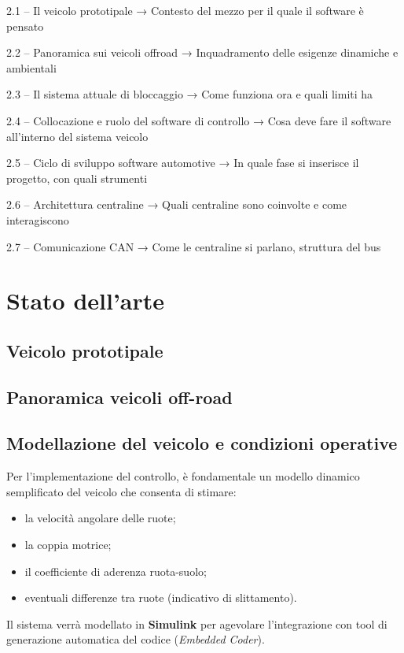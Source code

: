 \documentclass[11pt]{report}
\begin{document}
	
	2.1 – Il veicolo prototipale
	→ Contesto del mezzo per il quale il software è pensato
	
	2.2 – Panoramica sui veicoli offroad
	→ Inquadramento delle esigenze dinamiche e ambientali
	
	2.3 – Il sistema attuale di bloccaggio
	→ Come funziona ora e quali limiti ha
	
	2.4 – Collocazione e ruolo del software di controllo
	→ Cosa deve fare il software all’interno del sistema veicolo
	
	2.5 – Ciclo di sviluppo software automotive
	→ In quale fase si inserisce il progetto, con quali strumenti
	
	2.6 – Architettura centraline
	→ Quali centraline sono coinvolte e come interagiscono
	
	2.7 – Comunicazione CAN
	→ Come le centraline si parlano, struttura del bus
	
	\chapter{Stato dell'arte}
	
	\section{Veicolo prototipale}
	
	
	\section{Panoramica veicoli off-road }
	
	\section{Modellazione del veicolo e condizioni operative}
	
	Per l’implementazione del controllo, è fondamentale un modello dinamico semplificato del veicolo che consenta di stimare:
	
	\begin{itemize}
		\item la velocità angolare delle ruote;
		\item la coppia motrice;
		\item il coefficiente di aderenza ruota-suolo;
		\item eventuali differenze tra ruote (indicativo di slittamento).
	\end{itemize}
	
	Il sistema verrà modellato in \textbf{Simulink} per agevolare l’integrazione con tool di generazione automatica del codice (\textit{Embedded Coder}).
	
\end{document}
